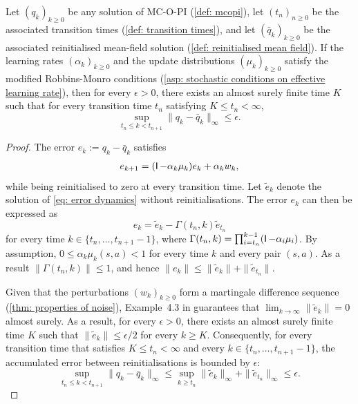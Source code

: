 \begin{lemma}
\label{thm: shrinking epsilon tube around deterministic solution}
Let $(q_k)_{k\ge 0}$ be any solution of MC-O-PI (\autoref{def: mcopi}),
let $(t_n)_{n \ge 0}$ be the associated transition times (\autoref{def: transition times}),
and let $(\bar q_k)_{k\ge 0}$ be the associated reinitialised mean-field solution (\autoref{def: reinitialised mean field}).
If the learning rates $(\alpha_k)_{k \ge 0}$ and the update distributions $(\mu_k)_{k \ge 0}$ satisfy the modified Robbins-Monro conditions (\autoref{asp: stochastic conditions on effective learning rate}),
then for every $\epsilon>0$, there exists an almost surely finite time $K$ such that for every transition time $t_n$ satisfying $K \le t_n<\infty$,
\[
\sup_{t_n \le k < t_{n+1}} \|q_k - \bar q_k \|_\infty \le \epsilon .
\]
\end{lemma}
\begin{proof}
The error $e_k := q_k - \bar q_k$ satisfies
\begin{align}
\label{eq: error dynamics}
e_{k+1} = (\operatorname{\mathsf{I}} -\alpha_k \mu_k) e_k + \alpha_k w_k ,
\end{align}
while being reinitialised to zero at every transition time.
Let $\tilde{e}_k$ denote the solution of \eqref{eq: error dynamics} without reinitialisations.
The error $e_k$ can then be expressed as 
\[
e_k = \tilde{e}_k - \Gamma(t_n, k) \tilde{e}_{t_n}
\]
for every time $k \in \{t_n, \dots, t_{n+1}-1\}$,
where $\Gamma(t_n, k) = \prod_{i=t_n}^{k-1} (\operatorname{\mathsf{I}} - \alpha_i \mu_i)$.
By assumption, $0 \le \alpha_k \mu_k(s,a) < 1$ for every time $k$ and every pair $(s,a)$. As a result $\| \Gamma(t_n, k) \| \le 1$, and hence $\|e_k\| \le \|\tilde{e}_k\| + \|\tilde{e}_{t_n}\|$.


Given that the perturbations $(w_k)_{k \ge 0}$ form a martingale difference sequence (\autoref{thm: properties of noise}),
Example~4.3 in \citep{Bertsekas1996Neuro-DynamicProgramming} guarantees that
$\lim_{k \to \infty} \|\tilde{e}_k\| = 0$ almost surely.
As a result,
for every $\epsilon > 0$, there exists an almost surely finite time $K$ such that $\|\tilde{e}_k\| \le \epsilon/2$ for every $k \ge K$.
Consequently, for every transition time that satisfies $K \le t_n < \infty$ and every $k \in \{t_n, \dots, t_{n+1} -1\}$, the accumulated error between reinitialisations is bounded by $\epsilon$:
\[
\sup_{t_n \le k < t_{n+1}} \|q_k - \bar{q}_k\|_\infty
\le
\sup_{k \ge t_n} \|\tilde e_k\|_\infty + \|\tilde e_{t_n}\|_\infty 
\le
\epsilon .
\]
\end{proof}

